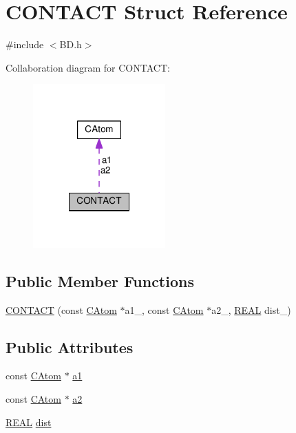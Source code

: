 \hypertarget{structCONTACT}{\section{C\-O\-N\-T\-A\-C\-T Struct Reference}
\label{structCONTACT}
}


{\ttfamily \#include $<$B\-D.\-h$>$}



Collaboration diagram for C\-O\-N\-T\-A\-C\-T\-:
\nopagebreak
\begin{figure}[H]
\begin{center}
\leavevmode
\includegraphics[width=144pt]{structCONTACT__coll__graph}
\end{center}
\end{figure}
\subsection*{Public Member Functions}
\begin{DoxyCompactItemize}
\item 
\hyperlink{structCONTACT_a226ad59f3e6b9af4f045bddc6bb81850}{C\-O\-N\-T\-A\-C\-T} (const \hyperlink{classCAtom}{C\-Atom} $\ast$a1\-\_\-, const \hyperlink{classCAtom}{C\-Atom} $\ast$a2\-\_\-, \hyperlink{util_8h_a5821460e95a0800cf9f24c38915cbbde}{R\-E\-A\-L} dist\-\_\-)
\end{DoxyCompactItemize}
\subsection*{Public Attributes}
\begin{DoxyCompactItemize}
\item 
const \hyperlink{classCAtom}{C\-Atom} $\ast$ \hyperlink{structCONTACT_a6b7ef226a4ad7e6bf1d0d95cc726fedd}{a1}
\item 
const \hyperlink{classCAtom}{C\-Atom} $\ast$ \hyperlink{structCONTACT_a1006fbbd65cd81db37727260eea01bb8}{a2}
\item 
\hyperlink{util_8h_a5821460e95a0800cf9f24c38915cbbde}{R\-E\-A\-L} \hyperlink{structCONTACT_a7d9feeae439550a0337361c7740638ea}{dist}
\end{DoxyCompactItemize}


